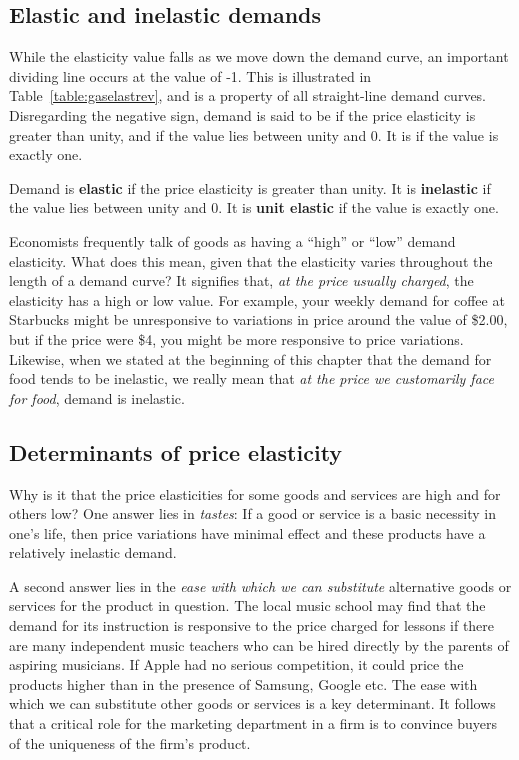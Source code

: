 \subsection*{Elastic and inelastic demands}

While the elasticity value falls as we move down the demand curve, an important dividing line occurs at the value of -1. This is illustrated in Table~\ref{table:gaselastrev}, and is a property of all straight-line demand curves. Disregarding the negative sign, demand is said to be  if the price elasticity is greater than unity, and  if the value lies between unity and 0. It is  if the value is exactly one.

\begin{DefBox}
Demand is \textbf{elastic} if the price elasticity is greater than unity. It is \textbf{inelastic} if the value lies between unity and 0. It is \textbf{unit elastic} if the value is exactly one.
\end{DefBox}

Economists frequently talk of goods as having a ``high'' or ``low'' demand elasticity. What does this mean, given that the elasticity varies throughout the length of a demand curve? It signifies that, \textit{at the price usually charged}, the elasticity has a high or low value. For example, your weekly demand for coffee at Starbucks might be unresponsive to variations in price around the value of \$2.00, but if the price were \$4, you might be more responsive to price variations. Likewise, when we stated at the beginning of this chapter that the demand for food tends to be inelastic, we really mean that \textit{at the price we customarily face for food}, demand is inelastic.

\subsection*{Determinants of price elasticity}

Why is it that the price elasticities for some goods and services are high and for others low? One answer lies in \textit{tastes}: If a good or service is a basic necessity in one's life, then price variations have minimal effect and these products have a relatively inelastic demand. 

A second answer lies in the \textit{ease with which we can substitute} alternative goods or services for the product in question. The local music school may find that the demand for its instruction is responsive to the price charged for lessons if there are many independent music teachers who can be hired directly by the parents of aspiring musicians. If Apple had no serious competition, it could price the products higher than in the presence of Samsung, Google etc. The ease with which we can substitute other goods or services is a key determinant. It follows that a critical role for the marketing department in a firm is to convince buyers of the uniqueness of the firm's product.

